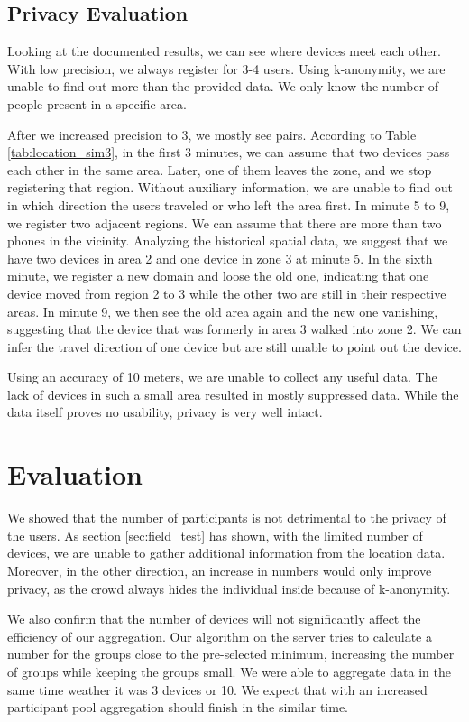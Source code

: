 \subsection{Privacy Evaluation}
Looking at the documented results, we can see where devices meet each other. With low precision, we always register for 3-4 users. Using k-anonymity, we are unable to find out more than the provided data. We only know the number of people present in a specific area. 

After we increased precision to 3, we mostly see pairs. According to Table \ref{tab:location_sim3}, in the first 3 minutes, we can assume that two devices pass each other in the same area. Later, one of them leaves the zone, and we stop registering that region. Without auxiliary information, we are unable to find out in which direction the users traveled or who left the area first. In minute 5 to 9, we register two adjacent regions. We can assume that there are more than two phones in the vicinity. Analyzing the historical spatial data, we suggest that we have two devices in area 2 and one device in zone 3 at minute 5. In the sixth minute, we register a new domain and loose the old one, indicating that one device moved from region 2 to 3 while the other two are still in their respective areas. In minute 9, we then see the old area again and the new one vanishing, suggesting that the device that was formerly in area 3 walked into zone 2. We can infer the travel direction of one device but are still unable to point out the device.

Using an accuracy of 10 meters, we are unable to collect any useful data. The lack of devices in such a small area resulted in mostly suppressed data. While the data itself proves no usability, privacy is very well intact.

\section{Evaluation}
We showed that the number of participants is not detrimental to the privacy of the users. As section \ref{sec:field_test} has shown, with the limited number of devices, we are unable to gather additional information from the location data. Moreover, in the other direction, an increase in numbers would only improve privacy, as the crowd always hides the individual inside because of k-anonymity.

We also confirm that the number of devices will not significantly affect the efficiency of our aggregation. Our algorithm on the server tries to calculate a number for the groups close to the pre-selected minimum, increasing the number of groups while keeping the groups small. We were able to aggregate data in the same time weather it was 3 devices or 10. We expect that with an increased participant pool aggregation should finish in the similar time.

